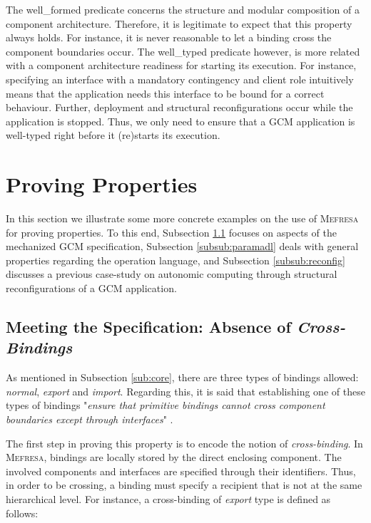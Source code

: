    		The \textsf{well\_formed} predicate concerns the structure and 
   	modular composition of a \textsf{component} architecture. Therefore, it is legitimate to expect that this property
   	always holds. For instance, it is never reasonable to let a \textsf{binding} cross the
	\textsf{component} boundaries occur. The \textsf{well\_typed} 
   	predicate however, is more related with a \textsf{component} architecture readiness 
   	for starting its execution. For instance, specifying an \textsf{interface} with a \textsf{mandatory} \textsf{contingency}
   	and \textsf{client} \textsf{role} intuitively means that the application needs this \textsf{interface} to be bound
   	for a correct behaviour. Further, deployment and structural reconfigurations occur while the application is
   	stopped. Thus, we only need to ensure that a \ac{GCM} application is well-typed right before it
   	(re)starts its execution.	


\section{Proving Properties}
\label{sub:ex}


		In this section we illustrate some more concrete examples on the use of \textsc{Mefresa}
	for proving properties. To this end, Subsection \ref{subsub:cross} focuses on aspects of the
 	mechanized \ac{GCM} specification, Subsection \ref{subsub:paramadl} deals with general properties
 	regarding the \textsf{operation} language, and Subsection \ref{subsub:reconfig} discusses
 	a previous case-study on autonomic computing through 
 	structural reconfigurations of a \ac{GCM} application.



\subsection{Meeting the Specification: Absence of \textit{Cross-Bindings}}
\label{subsub:cross}

	As mentioned in Subsection \ref{sub:core},  there are three types of \textsf{binding}s allowed:
	\textit{normal}, \textit{export} and \textit{import}. Regarding this, it is said
	that establishing one of these types of \textsf{binding}s 
	"\textit{ensure that primitive bindings cannot cross component
boundaries except through interfaces}" \cite{fractalSpec}. 

The first step in proving this property is to encode the notion of
\textit{cross-binding}. In \textsc{Mefresa}, \textsf{binding}s are locally stored
by the direct enclosing \textsf{component}. The involved \textsf{component}s
and \textsf{interface}s are specified through their identifiers. Thus, in order to
be crossing, a \textsf{binding} must specify a recipient that is not at the same hierarchical level.
For instance, a cross-binding of
\textit{export} type is defined as follows:

